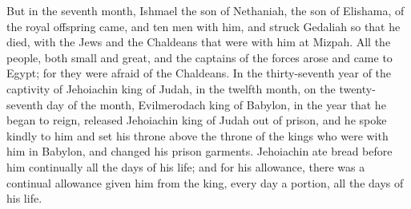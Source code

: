  But in the seventh month, Ishmael the son of Nethaniah,
the son of Elishama, of the royal offspring came, and ten men with him,
and struck Gedaliah so that he died, with the Jews and the Chaldeans
that were with him at Mizpah.  All the people, both small
and great, and the captains of the forces arose and came to Egypt; for
they were afraid of the Chaldeans.  In the thirty-seventh
year of the captivity of Jehoiachin king of Judah, in the twelfth month,
on the twenty-seventh day of the month, Evilmerodach king of Babylon, in
the year that he began to reign, released Jehoiachin king of Judah out
of prison,  and he spoke kindly to him and set his throne
above the throne of the kings who were with him in Babylon,
 and changed his prison garments. Jehoiachin ate bread
before him continually all the days of his life;  and for
his allowance, there was a continual allowance given him from the king,
every day a portion, all the days of his life.
